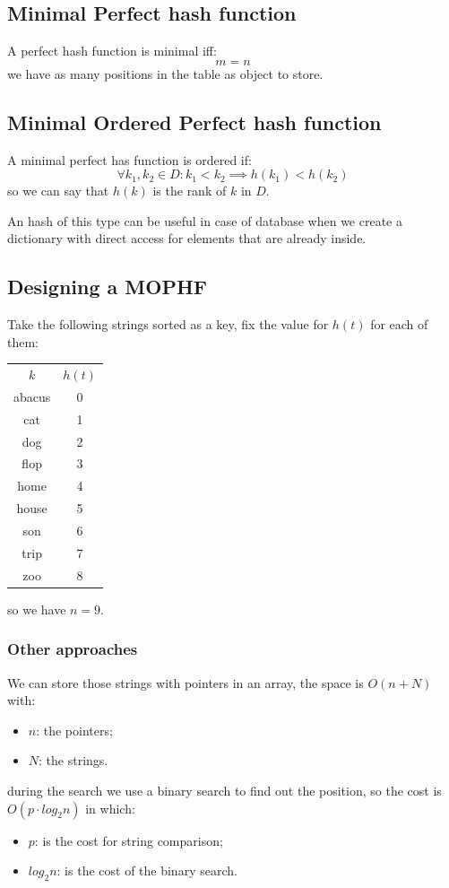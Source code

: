 \subsection{Minimal Perfect hash function}
A perfect hash function is minimal iff:
$$
    m = n
$$
we have as many positions in the table as object to store.

\subsection{Minimal Ordered Perfect hash function}
A minimal perfect has function is ordered if:
$$
    \forall k_1, k_2 \in D: k_1 < k_2 \implies h(k_1) < h(k_2)
$$
so we can say that $h(k)$ is the rank of $k$ in $D$.

An hash of this type can be useful in case of database when we create a dictionary with direct access for elements that are already inside.

\subsection{Designing a MOPHF}
Take the following strings sorted as a key, fix the value for $h(t)$ for each of them:
\begin{table}[H]
    \centering
    \begin{tabular}{c|c}
        $k$ & $h(t)$ \\
        abacus & 0 \\
        cat & 1 \\
        dog & 2 \\
        flop & 3 \\
        home & 4 \\
        house & 5 \\
        son & 6 \\
        trip & 7 \\
        zoo & 8 \\
    \end{tabular}
\end{table}
so we have $n = 9$.

\subsubsection{Other approaches}
We can store those strings with pointers in an array, the space is $O(n + N)$ with:
\begin{itemize}
    \item $n$: the pointers;
    \item $N$: the strings.
\end{itemize}
during the search we use a binary search to find out the position, so the cost is $O(p \cdot log_2 n)$ in which:
\begin{itemize}
    \item $p$: is the cost for string comparison;
    \item $log_2 n$: is the cost of the binary search.
\end{itemize}

